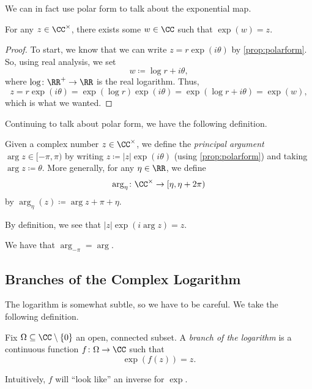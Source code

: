 \documentclass[../notes.tex]{subfiles}
\begin{document}
We can in fact use polar form to talk about the exponential map.
\begin{corollary} \label{cor:expsurj}
	For any $z\in\CC^\times$, there exists some $w\in\CC$ such that $\exp(w)=z$.
\end{corollary}
\begin{proof}
	To start, we know that we can write $z=r\exp(i\theta)$ by \autoref{prop:polarform}. So, using real analysis, we set
	\[w\coloneqq \log r+i\theta,\]
	where $\log\colon \RR^+\to\RR$ is the real logarithm. Thus,
	\[z=r\exp(i\theta)=\exp(\log r)\exp(i\theta)=\exp(\log r+i\theta)=\exp(w),\]
	which is what we wanted.
\end{proof}
Continuing to talk about polar form, we have the following definition.
\begin{definition}[Argument]
	Given a complex number $z\in\CC^\times$, we define the \textit{principal argument} $\arg z\in[-\pi,\pi)$ by writing $z\coloneqq |z|\exp(i\theta)$ (using \autoref{prop:polarform}) and taking $\arg z\coloneqq \theta$. More generally, for any $\eta\in\RR$, we define
	\[\arg_\eta\colon \CC^\times\to[\eta,\eta+2\pi)\]
	by $\arg_\eta(z)\coloneqq \arg z+\pi+\eta$.
\end{definition}
\begin{remark}[Nir] \label{rem:unwindingarg}
	By definition, we see that $|z|\exp(i\arg z)=z$.
\end{remark}
\begin{example}
	We have that $\arg_{-\pi}=\arg$.
\end{example}

\subsection{Branches of the Complex Logarithm}
The logarithm is somewhat subtle, so we have to be careful. We take the following definition.
\begin{definition}
	Fix $\Omega\subseteq\CC\setminus\{0\}$ an open, connected subset. A \textit{branch of the logarithm} is a continuous function $f\colon \Omega\to\CC$ such that
	\[\exp(f(z))=z.\] 
\end{definition}
Intuitively, $f$ will ``look like'' an inverse for $\exp$.
\end{document}
